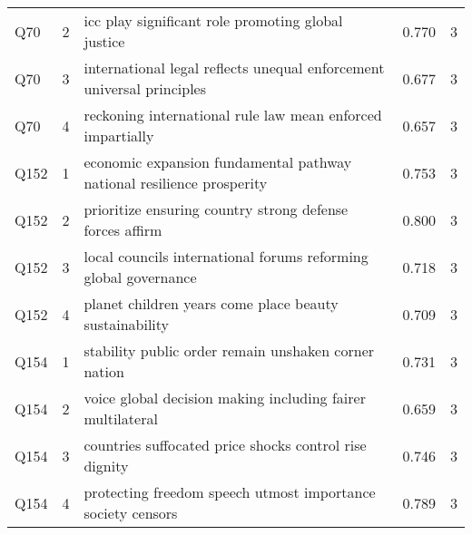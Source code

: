 \begin{longtable}{lllrl}
Q70 & 2 & icc play significant role promoting global justice & 0.770 & 3 \\
Q70 & 3 & international legal reflects unequal enforcement universal principles & 0.677 & 3 \\
Q70 & 4 & reckoning international rule law mean enforced impartially & 0.657 & 3 \\
Q152 & 1 & economic expansion fundamental pathway national resilience prosperity & 0.753 & 3 \\
Q152 & 2 & prioritize ensuring country strong defense forces affirm & 0.800 & 3 \\
Q152 & 3 & local councils international forums reforming global governance & 0.718 & 3 \\
Q152 & 4 & planet children years come place beauty sustainability & 0.709 & 3 \\
Q154 & 1 & stability public order remain unshaken corner nation & 0.731 & 3 \\
Q154 & 2 & voice global decision making including fairer multilateral & 0.659 & 3 \\
Q154 & 3 & countries suffocated price shocks control rise dignity & 0.746 & 3 \\
Q154 & 4 & protecting freedom speech utmost importance society censors & 0.789 & 3 \\
\end{longtable}
